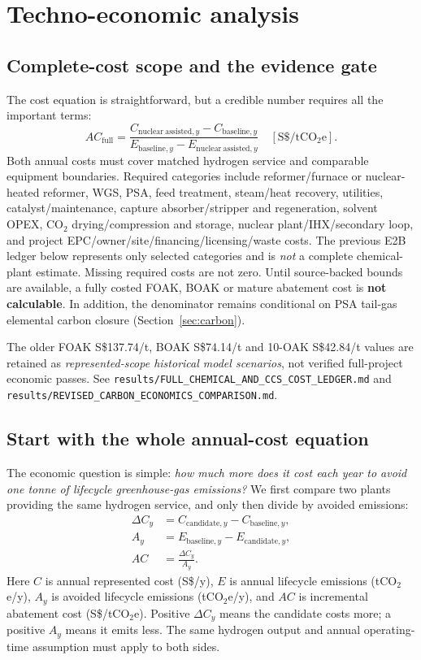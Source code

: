 \section{Techno-economic analysis}\label{sec:tea}
\subsection{Complete-cost scope and the evidence gate}
The cost equation is straightforward, but a credible number requires all the important terms:
\[
AC_{\mathrm{full}}=
\frac{C_{\mathrm{nuclear\ assisted},y}-C_{\mathrm{baseline},y}}
{E_{\mathrm{baseline},y}-E_{\mathrm{nuclear\ assisted},y}}
\quad[\mathrm{S\$/tCO_2e}].
\]
Both annual costs must cover matched hydrogen service and comparable equipment boundaries. Required categories include reformer/furnace or nuclear-heated reformer, WGS, PSA, feed treatment, steam/heat recovery, utilities, catalyst/maintenance, capture absorber/stripper and regeneration, solvent OPEX, CO$_2$ drying/compression and storage, nuclear plant/IHX/secondary loop, and project EPC/owner/site/financing/licensing/waste costs. The previous E2B ledger below represents only selected categories and is \emph{not} a complete chemical-plant estimate. Missing required costs are not zero. Until source-backed bounds are available, a fully costed FOAK, BOAK or mature abatement cost is \textbf{not calculable}. In addition, the denominator remains conditional on PSA tail-gas elemental carbon closure (Section~\ref{sec:carbon}).

The older FOAK S\$137.74/t, BOAK S\$74.14/t and 10-OAK S\$42.84/t values are retained as \emph{represented-scope historical model scenarios}, not verified full-project economic passes. See \texttt{results/FULL\_CHEMICAL\_AND\_CCS\_COST\_LEDGER.md} and \texttt{results/REVISED\_CARBON\_ECONOMICS\_COMPARISON.md}.



\subsection{Start with the whole annual-cost equation}
The economic question is simple: \emph{how much more does it cost each year to avoid one tonne of lifecycle greenhouse-gas emissions?} We first compare two plants providing the same hydrogen service, and only then divide by avoided emissions:
\begin{align}
\Delta C_y &= C_{\mathrm{candidate},y}-C_{\mathrm{baseline},y},\\
A_y &= E_{\mathrm{baseline},y}-E_{\mathrm{candidate},y},\\
AC &= \frac{\Delta C_y}{A_y}.
\end{align}
Here $C$ is annual represented cost (S\$/y), $E$ is annual lifecycle emissions (tCO$_2$e/y), $A_y$ is avoided lifecycle emissions (tCO$_2$e/y), and $AC$ is incremental abatement cost (S\$/tCO$_2$e). Positive $\Delta C_y$ means the candidate costs more; a positive $A_y$ means it emits less. The same hydrogen output and annual operating-time assumption must apply to both sides.

